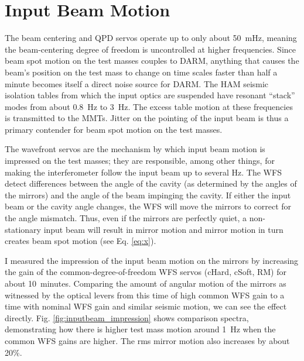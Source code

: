 \section{Input Beam Motion}
The beam centering and QPD servos operate up to only about 50~mHz,
meaning the beam-centering degree of freedom is uncontrolled at higher
frequencies. Since beam spot motion on the test masses couples to
DARM, anything that causes the beam's position on the test mass to
change on time scales faster than half a minute becomes itself a
direct noise source for DARM. The HAM seismic isolation tables from
which the input optics are suspended have resonant ``stack'' modes
from about 0.8~Hz to 3~Hz. The excess table motion at these
frequencies is transmitted to the MMTs. Jitter on the pointing of the
input beam is thus a primary contender for beam spot motion on the
test masses.


The wavefront servos are the mechanism by which input beam motion is
impressed on the test masses; they are responsible, among other
things, for making the interferometer follow the input beam up to
several Hz. The WFS detect differences between the angle of the cavity
(as determined by the angles of the mirrors) and the angle of the beam
impinging the cavity. If either the input beam or the cavity angle
changes, the WFS will move the mirrors to correct for the angle
mismatch. Thus, even if the mirrors are perfectly quiet, a
non-stationary input beam will result in mirror motion and mirror
motion in turn creates beam spot motion (see Eq. \ref{eq:x}).

I measured the impression of the input beam motion on the mirrors by
increasing the gain of the common-degree-of-freedom WFS servos (cHard,
cSoft, RM) for about 10~minutes. Comparing the amount of angular motion
of the mirrors as witnessed by the optical levers from this time of
high common WFS gain to a time with nominal WFS gain and similar
seismic motion, we can see the effect
directly. Fig. \ref{fig:inputbeam_impression} shows comparison
spectra, demonstrating how there is higher test mass motion around
1~Hz when the common WFS gains are higher. The rms mirror motion also
increases by about 20\%.

